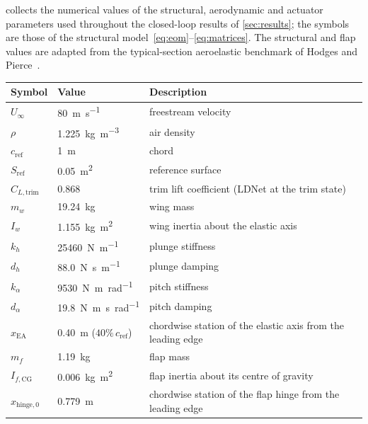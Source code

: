  collects the numerical values of the structural, aerodynamic and
actuator parameters used throughout the closed-loop results of \cref{sec:results}; the symbols
are those of the structural model~\eqref{eq:eom}--\eqref{eq:matrices}. The structural and flap
values are adapted from the typical-section aeroelastic benchmark of Hodges and
Pierce~\cite{hodges2011aeroelasticity}.

\begin{table}[t]
    \centering
    \begin{tabular}{|p{}|p{}|p{}|}
    \hline
    \rowcolor{bluePoli!40}
    Symbol & Value & Description \T\B \\
    \hline\hline
    $U_\infty$ & \SI{80}{\meter\per\second} & freestream velocity \T\B \\
    $\rho$ & \SI{1.225}{\kilogram\per\cubic\meter} & air density \T\B \\
    $c_{\mathrm{ref}}$ & \SI{1}{\meter} & chord \T\B \\
    $S_{\mathrm{ref}}$ & \SI{0.05}{\square\meter} & reference surface \T\B \\
    $C_{L,\text{trim}}$ & $0.868$ & trim lift coefficient (LDNet at the trim state) \T\B \\
    \hline
    $m_w$ & \SI{19.24}{\kilogram} & wing mass \T\B \\
    $I_w$ & \SI{1.155}{\kilogram\square\meter} & wing inertia about the elastic axis \T\B \\
    $k_h$ & \SI{25460}{\newton\per\meter} & plunge stiffness \T\B \\
    $d_h$ & \SI{88.0}{\newton\second\per\meter} & plunge damping \T\B \\
    $k_\alpha$ & \SI{9530}{\newton\meter\per\radian} & pitch stiffness \T\B \\
    $d_\alpha$ & \SI{19.8}{\newton\meter\second\per\radian} & pitch damping \T\B \\
    $x_{\mathrm{EA}}$ & \SI{0.40}{\meter} ($40\%\,c_{\mathrm{ref}}$) & chordwise station of the elastic axis from the leading edge \T\B \\
    \hline
    $m_f$ & \SI{1.19}{\kilogram} & flap mass \T\B \\
    $I_{f,\mathrm{CG}}$ & \SI{0.006}{\kilogram\square\meter} & flap inertia about its centre of gravity \T\B \\
    $x_{\mathrm{hinge},0}$ & \SI{0.779}{\meter} & chordwise station of the flap hinge from the leading edge \T\B \\

\end{tabular}
\end{table}
